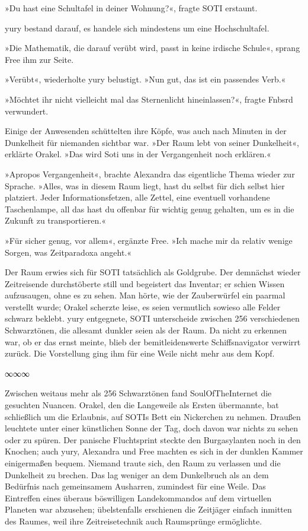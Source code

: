 »Du hast eine Schultafel in deiner Wohnung?«, fragte SOTI erstaunt.

yury bestand darauf, es handele sich mindestens um eine Hochschultafel.

»Die Mathematik, die darauf verübt wird, passt in keine irdische Schule«, sprang Free ihm zur Seite.

»Verübt«, wiederholte yury belustigt. »Nun gut, das ist ein passendes Verb.«

»Möchtet ihr nicht vielleicht mal das Sternenlicht hineinlassen?«, fragte Fnbsrd verwundert.

Einige der Anwesenden schüttelten ihre Köpfe, was auch nach Minuten in der Dunkelheit für niemanden sichtbar war. »Der Raum lebt von seiner Dunkelheit«, erklärte Orakel. »Das wird Soti uns in der Vergangenheit noch erklären.«

»Apropos Vergangenheit«, brachte Alexandra das eigentliche Thema wieder zur Sprache. »Alles, was in diesem Raum liegt, hast du selbst für dich selbst hier platziert. Jeder Informationsfetzen, alle Zettel, eine eventuell vorhandene Taschenlampe, all das hast du offenbar für wichtig genug gehalten, um es in die Zukunft zu transportieren.«

»Für sicher genug, vor allem«, ergänzte Free. »Ich mache mir da relativ wenige Sorgen, was Zeitparadoxa angeht.«

Der Raum erwies sich für SOTI tatsächlich als Goldgrube. Der demnächst wieder Zeitreisende durchstöberte still und begeistert das Inventar; er schien Wissen aufzusaugen, ohne es zu sehen. Man hörte, wie der Zauberwürfel ein paarmal verstellt wurde; Orakel scherzte leise, es seien vermutlich sowieso alle Felder schwarz beklebt. yury entgegnete, SOTI unterscheide zwischen 256 verschiedenen Schwarztönen, die allesamt dunkler seien als der Raum. Da nicht zu erkennen war, ob er das ernst meinte, blieb der bemitleidenswerte Schiffsnavigator verwirrt zurück. Die Vorstellung ging ihm für eine Weile nicht mehr aus dem Kopf.

\begin{center}
∞∞∞
\end{center}

Zwischen weitaus mehr als 256 Schwarztönen fand SoulOfTheInternet die gesuchten Nuancen. Orakel, den die Langeweile als Ersten übermannte, bat schließlich um die Erlaubnis, auf SOTIs Bett ein Nickerchen zu nehmen. Draußen leuchtete unter einer künstlichen Sonne der Tag, doch davon war nichts zu sehen oder zu spüren. Der panische Fluchtsprint steckte den Burgasylanten noch in den Knochen; auch yury, Alexandra und Free machten es sich in der dunklen Kammer einigermaßen bequem. Niemand traute sich, den Raum zu verlassen und die Dunkelheit zu brechen. Das lag weniger an dem Dunkelbruch als an dem Bedürfnis nach gemeinsamem Ausharren, zumindest für eine Weile. Das Eintreffen eines überaus böswilligen Landekommandos auf dem virtuellen Planeten war abzusehen; übelstenfalls erschienen die Zeitjäger einfach inmitten des Raumes, weil ihre Zeitreisetechnik auch Raumsprünge ermöglichte.

